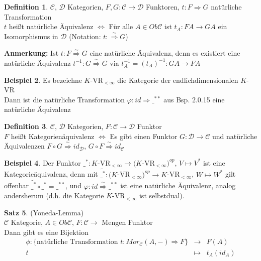 \documentclass[10pt,a4paper,numbers=endperiod]{scrreprt}
\theoremstyle{definition}
\newtheorem{satz}{Satz}[section]
\newtheorem{defi}[satz]{Definition}
\newtheorem{bsp}[satz]{Beispiel}
\begin{document}
\begin{defi}
	$\mathcal{C}$, $\mathcal{D}$ Kategorien, $F, G: \mathcal{C} \to \mathcal{D}$ Funktoren, $t: F \Rightarrow G$ natürliche Transformation\\
	$t$ heißt natürliche Äquivalenz $\Leftrightarrow$ Für alle $A \in Ob \mathcal{C}$ ist $t_A: FA \to GA$ ein Isomorphismus in $\mathcal{D}$ (Notation: $t: \overset{\sim}{\Rightarrow} G$)
\end{defi}

\textbf{Anmerkung:} Ist $t: F \overset{\sim}{\Rightarrow} G$ eine natürliche Äquivalenz, denn es existiert eine natürliche Äquivalenz $t^{-1}: G \overset{\sim}{\Rightarrow} G$ via $t^{-1}_A = (t_A)^{-1}: GA \to FA$

\begin{bsp}
	Es bezeichne $K$-VR$_{< \infty}$ die Kategorie der endlichdimensionalen $K$-VR\\
	Dann ist die natürliche Transformation $\varphi: id \Rightarrow \_^{**}$ aus Bsp. 2.0.15 eine natürliche Äquivalenz
\end{bsp}

\begin{defi}
	$\mathcal{C}$, $\mathcal{D}$ Kategorien, $F: \mathcal{C} \to \mathcal{D}$ Funktor\\
	$F$ heißt Kategorienäquivalenz $\Leftrightarrow$ Es gibt einen Funktor $G: \mathcal{D} \to \mathcal{C}$ und natürliche Äquivalenzen $F \circ G \overset{\sim}{\Rightarrow} id_\mathcal{D}$, $G \circ F \overset{\sim}{\Rightarrow} id_\mathcal{C}$
\end{defi}

\begin{bsp}
	Der Funktor $\_^*: K$-VR$_{< \infty} \to (K$-VR$_{< \infty})^{op}$, $V \mapsto V^*$ ist eine Kategorieäquivalenz, denn mit $\tilde{\_^*}: (K$-VR$_{< \infty})^{op} \to K$-VR$_{< \infty}$, $W \mapsto W^*$ gilt offenbar $\tilde{\_^*} \circ \_^* = \_^{**}$, und $\varphi: id \overset{\sim}{\Rightarrow} \_^{**}$ ist eine natürliche Äquivalenz, analog andersherum (d.h. die Kategorie $K$-VR$_{< \infty}$ ist selbstdual).
\end{bsp}

\begin{satz}
	(Yoneda-Lemma)\\
	$\mathcal{C}$ Kategorie, $A \in Ob \mathcal{C}$, $F: \mathcal{C} \to$ Mengen Funktor\\
	Dann gibt es eine Bijektion \begin{eqnarray*}
	\phi: \{\text{natürliche Transformation } t: Mor_\mathcal{C} (A, -) \Rightarrow F\} &\longrightarrow& F(A)\\
	t &\longmapsto& t_A(id_A)
	\end{eqnarray*}
\end{satz}
\end{document}
